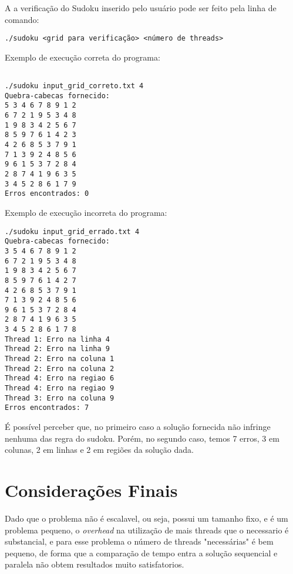 \documentclass[a4paper, 12pt]{article}
\begin{document}
A a verificação do Sudoku inserido pelo usuário pode ser feito pela linha de comando:
\begin{verbatim}
./sudoku <grid para verificação> <número de threads>
\end{verbatim}

Exemplo de execução correta do programa:
\begin{verbatim}

./sudoku input_grid_correto.txt 4
Quebra-cabecas fornecido:
5 3 4 6 7 8 9 1 2
6 7 2 1 9 5 3 4 8
1 9 8 3 4 2 5 6 7
8 5 9 7 6 1 4 2 3
4 2 6 8 5 3 7 9 1
7 1 3 9 2 4 8 5 6
9 6 1 5 3 7 2 8 4
2 8 7 4 1 9 6 3 5
3 4 5 2 8 6 1 7 9
Erros encontrados: 0
\end{verbatim}

Exemplo de execução incorreta do programa:
\begin{verbatim}
./sudoku input_grid_errado.txt 4
Quebra-cabecas fornecido:
3 5 4 6 7 8 9 1 2
6 7 2 1 9 5 3 4 8
1 9 8 3 4 2 5 6 7
8 5 9 7 6 1 4 2 7
4 2 6 8 5 3 7 9 1
7 1 3 9 2 4 8 5 6
9 6 1 5 3 7 2 8 4
2 8 7 4 1 9 6 3 5
3 4 5 2 8 6 1 7 8
Thread 1: Erro na linha 4
Thread 2: Erro na linha 9
Thread 2: Erro na coluna 1
Thread 2: Erro na coluna 2
Thread 4: Erro na regiao 6
Thread 4: Erro na regiao 9
Thread 3: Erro na coluna 9
Erros encontrados: 7
\end{verbatim}

É possível perceber que, no primeiro caso a solução fornecida não infringe
nenhuma das regra do sudoku. Porém, no segundo caso, temos 7 erros, 3 em
colunas, 2 em linhas e 2 em regiões da solução dada.

\section{Considerações Finais}
Dado que o problema não é escalavel, ou seja, possui um tamanho fixo, e é um
problema pequeno, o \textit{overhead} na utilização de mais threads que o
necessario é substancial, e para esse problema o número de threads "necessárias"
é bem pequeno,  de forma que a comparação de tempo entra a solução sequencial e
paralela não obtem resultados muito satisfatorios.
\end{document}
